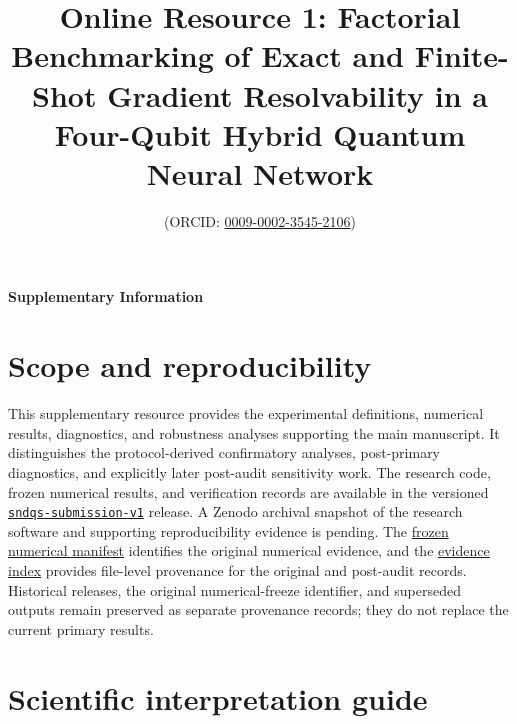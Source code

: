 \documentclass[pdflatex,sn-basic,Numbered]{sn-jnl}
\begin{document}
\title{Online Resource 1: Factorial Benchmarking of Exact and Finite-Shot Gradient Resolvability in a Four-Qubit Hybrid Quantum Neural Network}
\author*[1]{  (ORCID: \href{https://orcid.org/0009-0002-3545-2106}{0009-0002-3545-2106})}
\maketitle

\begin{center}
\textbf{Supplementary Information}
\end{center}

\section{Scope and reproducibility}

This supplementary resource provides the experimental definitions, numerical results, diagnostics, and robustness analyses supporting the main manuscript. It distinguishes the protocol-derived confirmatory analyses, post-primary diagnostics, and explicitly later post-audit sensitivity work. The research code, frozen numerical results, and verification records are available in the versioned \href{https://github.com/Brandon-Shen/few-qubit-qnn-snr/releases/tag/sndqs-submission-v1}{\texttt{sndqs-submission-v1}} release.
A Zenodo archival snapshot of the research software and supporting reproducibility evidence is pending. The \href{https://github.com/Brandon-Shen/few-qubit-qnn-snr/blob/sndqs-submission-v1/results/final_submission_v1/manifest.json}{frozen numerical manifest} identifies the original numerical evidence, and the \href{https://github.com/Brandon-Shen/few-qubit-qnn-snr/blob/sndqs-submission-v1/submission/sndqs-submission-v1/EVIDENCE_INDEX.md}{evidence index} provides file-level provenance for the original and post-audit records. Historical releases, the original numerical-freeze identifier, and superseded outputs remain preserved as separate provenance records; they do not replace the current primary results.

\section{Scientific interpretation guide}
\end{document}
